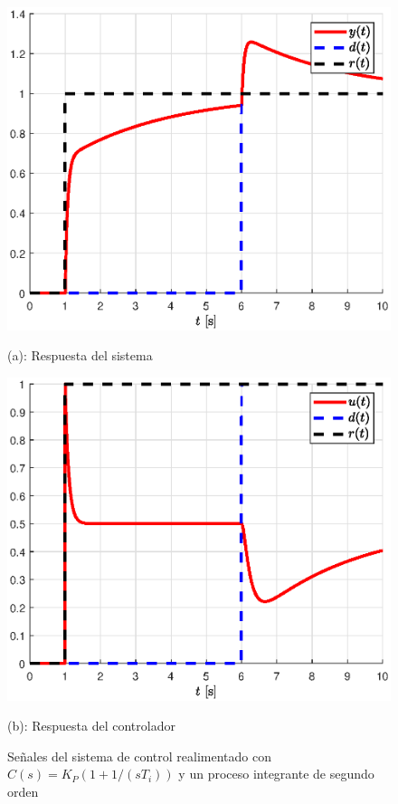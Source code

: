 \begin{itemize}
\begin{figure}[!h]
    \centering
    \begin{minipage}{0.45\linewidth}
        \includegraphics[width=\linewidth]{figs/fig4.eps}
        \caption*{(a): Respuesta del sistema}
    \end{minipage}
    \begin{minipage}{0.45\linewidth}
        \includegraphics[width=\linewidth]{figs/fig5.eps}
        \caption*{(b): Respuesta del controlador}
    \end{minipage}
    \caption{Señales del sistema de control realimentado con $C(s) = K_P(1 + 1/(sT_i))$ y un proceso integrante de segundo orden}
    \label{fig4}
\end{figure}
\end{itemize}

